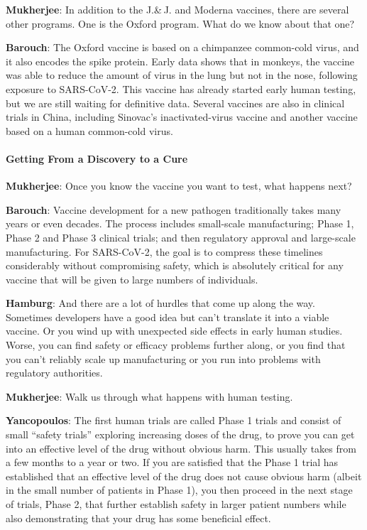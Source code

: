 \textbf{Mukherjee}: In addition to the J.\& J. and Moderna vaccines,
there are several other programs. One is the Oxford program. What do we
know about that one?

\textbf{Barouch}: The Oxford vaccine is based on a chimpanzee
common-cold virus, and it also encodes the spike protein. Early data
shows that in monkeys, the vaccine was able to reduce the amount of
virus in the lung but not in the nose, following exposure to SARS-CoV-2.
This vaccine has already started early human testing, but we are still
waiting for definitive data. Several vaccines are also in clinical
trials in China, including Sinovac's inactivated-virus vaccine and
another vaccine based on a human common-cold virus.

\hypertarget{getting-from-a-discovery-to-a-cure}{%
\paragraph{Getting From a Discovery to a
Cure}\label{getting-from-a-discovery-to-a-cure}}

\textbf{Mukherjee}: Once you know the vaccine you want to test, what
happens next?

\textbf{Barouch}: Vaccine development for a new pathogen traditionally
takes many years or even decades. The process includes small-scale
manufacturing; Phase 1, Phase 2 and Phase 3 clinical trials; and then
regulatory approval and large-scale manufacturing. For SARS-CoV-2, the
goal is to compress these timelines considerably without compromising
safety, which is absolutely critical for any vaccine that will be given
to large numbers of individuals.

\textbf{Hamburg}: And there are a lot of hurdles that come up along the
way. Sometimes developers have a good idea but can't translate it into a
viable vaccine. Or you wind up with unexpected side effects in early
human studies. Worse, you can find safety or efficacy problems further
along, or you find that you can't reliably scale up manufacturing or you
run into problems with regulatory authorities.

\textbf{Mukherjee}: Walk us through what happens with human testing.

\textbf{Yancopoulos}: The first human trials are called Phase 1 trials
and consist of small ``safety trials'' exploring increasing doses of the
drug, to prove you can get into an effective level of the drug without
obvious harm. This usually takes from a few months to a year or two. If
you are satisfied that the Phase 1 trial has established that an
effective level of the drug does not cause obvious harm (albeit in the
small number of patients in Phase 1), you then proceed in the next stage
of trials, Phase 2, that further establish safety in larger patient
numbers while also demonstrating that your drug has some beneficial
effect.


